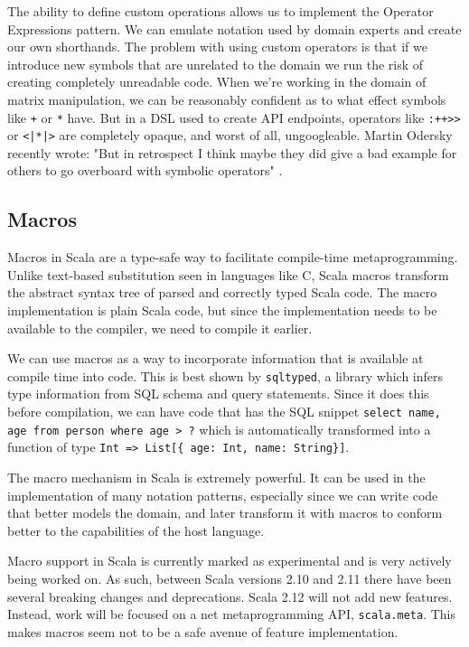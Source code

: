 The ability to define custom operations allows us to implement the Operator Expressions pattern.
We can emulate notation used by domain experts and create our own shorthands.
The problem with using custom operators is that if we introduce new symbols that are unrelated to the domain we run the risk of creating completely unreadable code.
When we're working in the domain of matrix manipulation, we can be reasonably confident as to what effect symbols like \texttt{+} or \texttt{*} have.
But in a DSL used to create API endpoints, operators like \texttt{:++>>} or \texttt{<|*|>} are completely opaque, and worst of all, ungoogleable.
Martin Odersky recently wrote: "But in retrospect I think maybe they did give a bad example for others to go overboard with symbolic operators" \autocite{Odersky:2016}.


\subsection{Macros}

Macros in Scala are a type-safe way to facilitate compile-time metaprogramming.
Unlike text-based substitution seen in languages like C, Scala macros transform the abstract syntax tree of parsed and correctly typed Scala code.
The macro implementation is plain Scala code, but since the implementation needs to be available to the compiler, we need to compile it earlier.

We can use macros as a way to incorporate information that is available at compile time into code.
This is best shown by \texttt{sqltyped}, a library which infers type information from SQL schema and query statements.
Since it does this before compilation, we can have code that has the SQL snippet \texttt{select name, age from person where age > ?} which is automatically transformed into a function of type \texttt{Int => List[\{ age: Int, name: String\}]}.

The macro mechanism in Scala is extremely powerful.
It can be used in the implementation of many notation patterns, especially since we can write code that better models the domain, and later transform it with macros to conform better to the capabilities of the host language.

Macro support in Scala is currently marked as experimental and is very actively being worked on.
As such, between Scala versions 2.10 and 2.11 there have been several breaking changes and deprecations.
Scala 2.12 will not add new features.
Instead, work will be focused on a net metaprogramming API, \texttt{scala.meta}.
This makes macros seem not to be a safe avenue of feature implementation.

